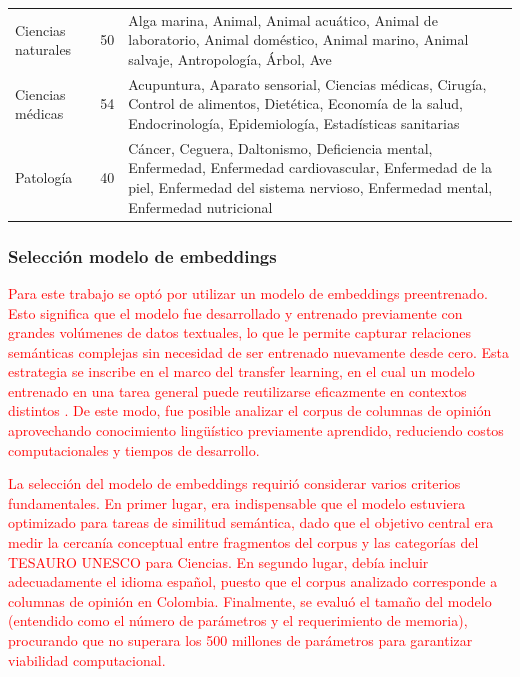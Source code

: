 \documentclass[11pt,a4paper]{article}
\begin{document}
{\begin{longtable}{p{3.5cm}P{2cm}p{9cm}}
			Ciencias naturales & 50 & Alga marina, Animal, Animal acuático, Animal de laboratorio, Animal doméstico, Animal marino, Animal salvaje, Antropología, Árbol, Ave \\
			
			Ciencias médicas & 54 & Acupuntura, Aparato sensorial, Ciencias médicas, Cirugía, Control de alimentos, Dietética, Economía de la salud, Endocrinología, Epidemiología, Estadísticas sanitarias \\
			
			Patología & 40 & Cáncer, Ceguera, Daltonismo, Deficiencia mental, Enfermedad, Enfermedad cardiovascular, Enfermedad de la piel, Enfermedad del sistema nervioso, Enfermedad mental, Enfermedad nutricional \\
			
		\end{longtable}
	}
	
	
	\subsubsection{Selección modelo de embeddings}
\textcolor{red}{Para este trabajo se optó por utilizar un modelo de embeddings preentrenado. Esto significa que el modelo fue desarrollado y entrenado previamente con grandes volúmenes de datos textuales, lo que le permite capturar relaciones semánticas complejas sin necesidad de ser entrenado nuevamente desde cero. Esta estrategia se inscribe en el marco del transfer learning, en el cual un modelo entrenado en una tarea general puede reutilizarse eficazmente en contextos distintos \cite{Hosna2022}. De este modo, fue posible analizar el corpus de columnas de opinión aprovechando conocimiento lingüístico previamente aprendido, reduciendo costos computacionales y tiempos de desarrollo.}

\textcolor{red}{La selección del modelo de embeddings requirió considerar varios criterios fundamentales. En primer lugar, era indispensable que el modelo estuviera optimizado para tareas de similitud semántica, dado que el objetivo central era medir la cercanía conceptual entre fragmentos del corpus y las categorías del TESAURO UNESCO para Ciencias. En segundo lugar, debía incluir adecuadamente el idioma español, puesto que el corpus analizado corresponde a columnas de opinión en Colombia. Finalmente, se evaluó el tamaño del modelo (entendido como el número de parámetros y el requerimiento de memoria), procurando que no superara los 500 millones de parámetros para garantizar viabilidad computacional.}
\end{document}
